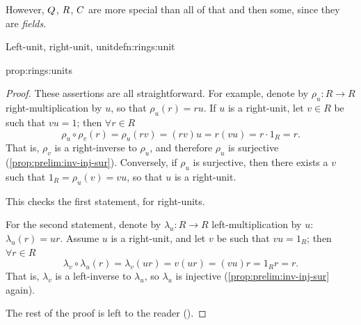 However, $Q$, $R$, $C$ are more special than all of that and then
some, since they are \emph{fields}.
\begin{defn}{Left-unit, right-unit, unit}{defn:rings:unit}
\end{defn}
\begin{prop}{}{prop:rings:units}
\end{prop}
\begin{proof}
  These assertions are all straightforward. For example, denote by
  $\rho_u : R \to R$ right-multiplication by $u$, so that
  $\rho_u(r) = ru$. If $u$ is a right-unit, let $v \in R$ be such that
  $vu = 1$; then $\forall r \in R$
  \[
    \rho_u \circ \rho_v(r) = \rho_u(rv) = (rv)u = r(vu) = r \cdot 1_R
    = r.
  \]
  That is, $\rho_v$ is a right-inverse to $\rho_u$, and therefore
  $\rho_u$ is surjective (\cref{prop:prelim:inv-inj-sur}).  Conversely, if
  $\rho_u$ is surjective, then there exists a $v$ such that
  $1_R = \rho_u(v) = vu$, so that $u$ is a right-unit.

  This checks the first statement, for right-units.

  For the second statement, denote by $\lambda_u : R \to R$
  left-multiplication by $u$: $\lambda_u(r) = ur$. Assume $u$ is a
  right-unit, and let $v$ be such that $vu = 1_R$; then
  $\forall r \in R$
  \[
    \lambda_v \circ \lambda_u(r) = \lambda_v(ur) = v(ur) = (vu)r = 1_R
    r = r.
  \]
  That is, $\lambda_v$ is a left-inverse to $\lambda_u$, so
  $\lambda_u$ is injective (\cref{prop:prelim:inv-inj-sur} again).

  The rest of the proof is left to the reader
  ().
\end{proof}
